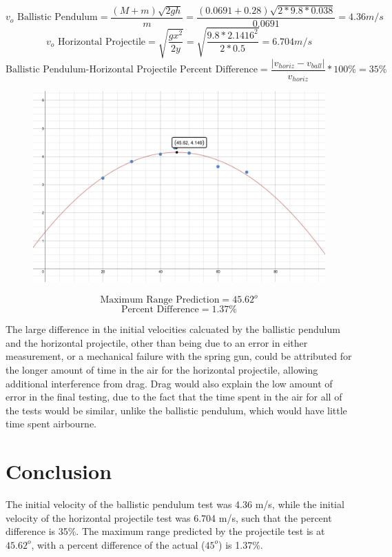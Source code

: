 \documentclass[11pt, titlepage]{article}
\begin{document}
$$v_o \text{ Ballistic Pendulum} = \frac{(M+m)\sqrt{2gh}}{m} = \frac{(0.0691 + 0.28)\sqrt{2*9.8*0.038}}{0.0691} = 4.36 m/s$$
$$v_o \text{ Horizontal Projectile} = \sqrt{\frac{gx^2}{2y}} = \sqrt{\frac{9.8*2.1416^2}{2*0.5}} = 6.704 m/s$$
$$\text{Ballistic Pendulum-Horizontal Projectile Percent Difference} = \frac{|v_{horiz} - v_{ball}|}{v_{horiz}} * 100\% = 35\%$$ 

\begin{figure}[p]
\centering
\hspace*{-16cm}
\includegraphics[scale=0.7, angle=0]{graph2.jpg}
\vspace*{-5cm}
\end{figure}

$$\text{Maximum Range Prediction} = 45.62^o$$
$$\text{Percent Difference} = 1.37\%$$

The large difference in the initial velocities calcuated by the ballistic pendulum and the horizontal projectile, other than being due to an error in either measurement, or a mechanical failure with the spring gun, could be attributed for the longer amount of time in the air for the horizontal projectile, allowing additional interference from drag. Drag would also explain the low amount of error in the final testing, due to the fact that the time spent in the air for all of the tests would be similar, unlike the ballistic pendulum, which would have little time spent airbourne.

\section*{Conclusion}
The initial velocity of the ballistic pendulum test was 4.36 m/s, while the initial velocity of the horizontal projectile test was 6.704 m/s, such that the percent difference is 35\%. The maximum range predicted by the projectile test is at $45.62^o$, with a percent difference of the actual ($45^o$) is 1.37\%.
\end{document}
